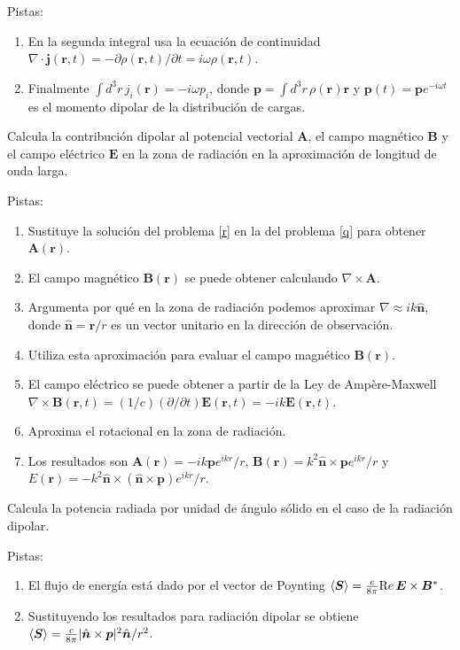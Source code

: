 \documentclass{exam}
\newenvironment{pistas}{\par\noindent Pistas:\begin{enumerate}} {\end{enumerate}}
\begin{document}
\begin{questions}
\begin{pistas}
    del origen para argumentar que la primera integral vale cero.
  \item En la segunda integral usa la ecuación de continuidad
    $\nabla\cdot\bm j(\bm r,t)=-\partial\rho(\bm r,t)/\partial
    t=i\omega\rho(\bm r,t)$.
  \item Finalmente $\int d^3r\, j_i(\bm r)= -i\omega p_i$, donde
    $\bm p=\int d^3r\, \rho(\bm r)\bm r$ y $\bm p(t)=\bm p e^{-i\omega
      t}$ es el momento dipolar de la distribución de cargas.
  \end{pistas}
\question \label{s} Calcula la contribución dipolar al potencial
  vectorial $\bm A$, el campo magnético $\bm B$ y el campo eléctrico
  $\bm E$ en la zona de radiación en la aproximación de longitud de
  onda larga.
  \begin{pistas}
  \item Sustituye la solución del problema \ref{r} en la del problema
    \ref{q} para obtener $\bm A(\bm r)$.
  \item El campo magnético $\bm B(\bm r)$ se puede obtener calculando
    $\nabla\times\bm A$.
  \item Argumenta por qué en la zona de radiación podemos aproximar
    $\nabla\approx ik\hat{\bm n}$, donde $\hat{\bm n}=\bm r/r$ es un
    vector unitario en la dirección de observación.
  \item Utiliza esta aproximación para evaluar el campo magnético $\bm
    B(\bm r)$.
  \item El campo eléctrico se puede obtener a partir de la Ley de
    Ampère-Maxwell $\nabla\times\bm B(\bm r,t)=(1/c)(\partial/\partial
    t)\bm E(\bm r,t)=-ik\bm E(\bm r,t)$.
  \item Aproxima el rotacional en la zona de radiación.
  \item Los resultados son $\bm A(\bm r)=-ik\bm p e^{ikr}/r$, $\bm
    B(\bm r)=k^2 \hat{\bm n}\times\bm p e^{ikr}/r$ y $E(\bm r)=-k^2
    \hat{\bm n}\times(\hat{\bm n}\times\bm p) e^{ikr}/r$.
  \end{pistas}
\question \label{t} Calcula la potencia radiada por unidad de ángulo
  sólido en el caso de la radiación dipolar.
  \begin{pistas}
  \item El flujo de energía está dado por el vector de Poynting
    $\braket{\bm S}=\frac{c}{8\pi}\text Re\, \bm E\times \bm B^*$.
  \item Sustituyendo los resultados para radiación dipolar se obtiene
    $\braket{\bm S}=\frac{c}{8\pi}|\hat{\bm n}\times\bm p|^2\hat{\bm
      n}/r^2$.

\end{pistas}
\end{questions}
\end{document}

